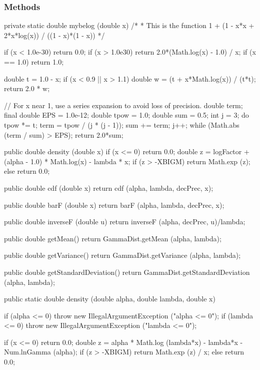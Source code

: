 \subsubsection* {Methods}
\begin{hide}
\begin{code}

   private static double mybelog (double x)
   /*
    * This is the function  1 + (1 - x*x + 2*x*log(x)) / ((1 - x)*(1 - x))
    */
   {
      if (x < 1.0e-30)
         return 0.0;
      if (x > 1.0e30)
         return 2.0*(Math.log(x) - 1.0) / x;
      if (x == 1.0)
         return 1.0;

      double t = 1.0 - x;
      if (x < 0.9 || x > 1.1) {
         double w = (t + x*Math.log(x)) / (t*t);
         return 2.0 * w;
      }

      // For x near 1, use a series expansion to avoid loss of precision.
      double term;
      final double EPS = 1.0e-12;
      double tpow = 1.0;
      double sum = 0.5;
      int j = 3;
      do {
         tpow *= t;
         term = tpow / (j * (j - 1));
         sum += term;
         j++;
      } while (Math.abs (term / sum) > EPS);
      return 2.0*sum;
   }


   public double density (double x) {
      if (x <= 0)
         return 0.0;
      double z = logFactor + (alpha - 1.0) * Math.log(x) - lambda * x;
      if (z > -XBIGM)
         return Math.exp (z);
      else
         return 0.0;
   }

   public double cdf (double x) {
      return cdf (alpha, lambda, decPrec, x);
   }

   public double barF (double x) {
      return barF (alpha, lambda, decPrec, x);
   }

   public double inverseF (double u) {
      return inverseF (alpha, decPrec, u)/lambda;
   }

   public double getMean() {
      return GammaDist.getMean (alpha, lambda);
   }

   public double getVariance() {
      return GammaDist.getVariance (alpha, lambda);
   }

   public double getStandardDeviation() {
      return GammaDist.getStandardDeviation (alpha, lambda);
   }
\end{code}
\end{hide}\begin{code}

   public static double density (double alpha, double lambda, double x)\begin{hide} {
      if (alpha <= 0)
         throw new IllegalArgumentException ("alpha <= 0");
      if (lambda <= 0)
         throw new IllegalArgumentException ("lambda <= 0");

      if (x <= 0)
         return 0.0;
      double z = alpha * Math.log (lambda*x) - lambda*x - Num.lnGamma (alpha);
      if (z > -XBIGM)
         return Math.exp (z) / x;
      else
         return 0.0;
   }\end{hide}
\end{code}

